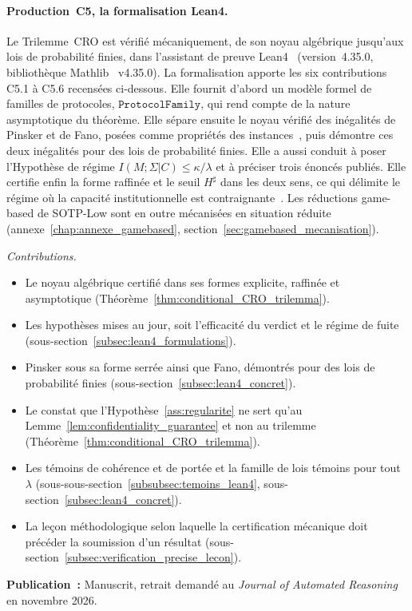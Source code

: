 \begin{sloppypar}
\paragraph{Production~C5, la formalisation Lean4.}
Le Trilemme~CRO est v\'erifi\'e m\'ecaniquement, de son noyau alg\'ebrique jusqu'aux lois
de probabilit\'e finies, dans l'assistant de preuve Lean4~\cite{Lean4,moura2015lean} (version~4.35.0,
biblioth\`eque Mathlib~\cite{Mathlib} v4.35.0). La formalisation apporte
les six contributions C5.1 \`a C5.6 recens\'ees ci-dessous. Elle fournit d'abord un mod\`ele formel de familles de protocoles,
$\mathtt{ProtocolFamily}$, qui rend compte de la nature asymptotique du th\'eor\`eme.
Elle s\'epare ensuite le noyau v\'erifi\'e des in\'egalit\'es de Pinsker
et de Fano, pos\'ees comme propri\'et\'es des instances~\cite{AbadiRogaway00,BanaComon12},
puis d\'emontre ces deux in\'egalit\'es pour des lois de probabilit\'e finies.
Elle a aussi conduit \`a poser l'Hypoth\`ese de r\'egime $I(M;\Sigma|C) \leq \kappa/\lambda$
et \`a pr\'eciser trois \'enonc\'es publi\'es. Elle certifie enfin la
forme raffin\'ee et le seuil $H^\sharp$ dans les deux sens, ce qui d\'elimite le r\'egime
o\`u la capacit\'e institutionnelle est contraignante~\cite{Affeldt2015,HibonPortier20,Lochbihler2016}. Les r\'eductions game-based de SOTP-Low sont en outre m\'ecanis\'ees en situation r\'eduite (annexe~\ref{chap:annexe_gamebased}, section~\ref{sec:gamebased_mecanisation}).

\noindent\textit{Contributions.}
\begin{itemize}
  \item[\textbf{C5.1}] Le noyau alg\'ebrique certifi\'e dans ses formes explicite, raffin\'ee et asymptotique (Th\'eor\`eme~\ref{thm:conditional_CRO_trilemma}).
  \item[\textbf{C5.2}] Les hypoth\`eses mises au jour, soit l'efficacit\'e du verdict et le r\'egime de fuite (sous-section~\ref{subsec:lean4_formulations}).
  \item[\textbf{C5.3}] Pinsker sous sa forme serr\'ee ainsi que Fano, d\'emontr\'es pour des lois de probabilit\'e finies (sous-section~\ref{subsec:lean4_concret}).
  \item[\textbf{C5.4}] Le constat que l'Hypoth\`ese~\ref{ass:regularite} ne sert qu'au Lemme~\ref{lem:confidentiality_guarantee} et non au trilemme (Th\'eor\`eme~\ref{thm:conditional_CRO_trilemma}).
  \item[\textbf{C5.5}] Les t\'emoins de coh\'erence et de port\'ee et la famille de lois t\'emoins pour tout $\lambda$ (sous-sous-section~\ref{subsubsec:temoins_lean4}, sous-section~\ref{subsec:lean4_concret}).
  \item[\textbf{C5.6}] La le\c{c}on m\'ethodologique selon laquelle la certification m\'ecanique doit pr\'ec\'eder la soumission d'un r\'esultat (sous-section~\ref{subsec:verification_precise_lecon}).
\end{itemize}

\textbf{Publication~:} Manuscrit, retrait demand\'e au \textit{Journal of Automated Reasoning} en novembre 2026.
\end{sloppypar}


